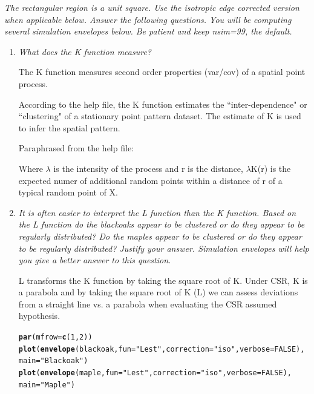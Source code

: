 \documentclass{article}\usepackage[]{graphicx}\usepackage[]{color}
\makeatletter
\newcommand{\hlnum}[1]{\textcolor[rgb]{0.686,0.059,0.569}{#1}}%
\newcommand{\hlstr}[1]{\textcolor[rgb]{0.192,0.494,0.8}{#1}}%
\newcommand{\hlstd}[1]{\textcolor[rgb]{0.345,0.345,0.345}{#1}}%
\newcommand{\hlkwc}[1]{\textcolor[rgb]{0.333,0.667,0.333}{#1}}%
\newcommand{\hlkwd}[1]{\textcolor[rgb]{0.737,0.353,0.396}{\textbf{#1}}}%
\newenvironment{kframe}{%
 \def\at@end@of@kframe{}%
 \ifinner\ifhmode%
  \def\at@end@of@kframe{\end{minipage}}%
  \begin{minipage}{\columnwidth}%
 \fi\fi%
 \def\FrameCommand##1{\hskip\@totalleftmargin \hskip-\fboxsep
 \colorbox{shadecolor}{##1}\hskip-\fboxsep
     \hskip-\linewidth \hskip-\@totalleftmargin \hskip\columnwidth}%
 \MakeFramed {\advance\hsize-\width
   \@totalleftmargin\z@ \linewidth\hsize
   \@setminipage}}%
 {\par\unskip\endMakeFramed%
 \at@end@of@kframe}
\newenvironment{knitrout}{}{} %
\makeatother
\begin{document}
\begin{enumerate}
\begin{knitrout}
{}



\end{knitrout}

{\it The rectangular region is a unit square. Use the isotropic edge corrected version when applicable below. Answer the following questions. You will be computing several simulation envelopes below. Be patient and keep nsim=99, the default.}

\begin{enumerate}
\item %
{\it What does the K function measure?}

The K function measures second order properties (var/cov) of a spatial point process.

According to the help file, the K function estimates the ``inter-dependence" or ``clustering" of a stationary point pattern dataset. The estimate of K is used to infer the spatial pattern.

Paraphrased from the help file:

Where $\lambda$ is the intensity of the process and r is the distance, $\lambda$K(r) is the expected numer of additional random points within a distance of r of a typical random point of X.


\item %
{\it It is often easier to interpret the L function than the K function. Based on the L function do the blackoaks appear to be clustered or do they appear to be regularly distributed? Do the maples appear to be clustered or do they appear to be regularly distributed? Justify your answer. Simulation envelopes will help you give a better answer to this question.}

L transforms the K function by taking the square root of K. Under CSR, K is a parabola and by taking the square root of K (L) we can assess deviations from a straight line vs. a parabola when evaluating the CSR assumed hypothesis.

\begin{knitrout}\footnotesize
{}\color{fgcolor}\begin{kframe}
\begin{alltt}
\hlkwd{par}\hlstd{(}\hlkwc{mfrow}\hlstd{=}\hlkwd{c}\hlstd{(}\hlnum{1}\hlstd{,}\hlnum{2}\hlstd{))}
\hlkwd{plot}\hlstd{(}\hlkwd{envelope}\hlstd{(blackoak,}\hlkwc{fun}\hlstd{=}\hlstr{"Lest"}\hlstd{,} \hlkwc{correction}\hlstd{=}\hlstr{"iso"}\hlstd{,} \hlkwc{verbose} \hlstd{=} \hlnum{FALSE}\hlstd{),}
     \hlkwc{main} \hlstd{=} \hlstr{"Blackoak"}\hlstd{)}
\hlkwd{plot}\hlstd{(}\hlkwd{envelope}\hlstd{(maple,} \hlkwc{fun}\hlstd{=}\hlstr{"Lest"}\hlstd{,} \hlkwc{correction}\hlstd{=}\hlstr{"iso"}\hlstd{,} \hlkwc{verbose} \hlstd{=} \hlnum{FALSE}\hlstd{),}
     \hlkwc{main} \hlstd{=} \hlstr{"Maple"}\hlstd{)}
\end{alltt}
\end{kframe}


\end{knitrout}
\end{enumerate}
\end{enumerate}
\end{document}
